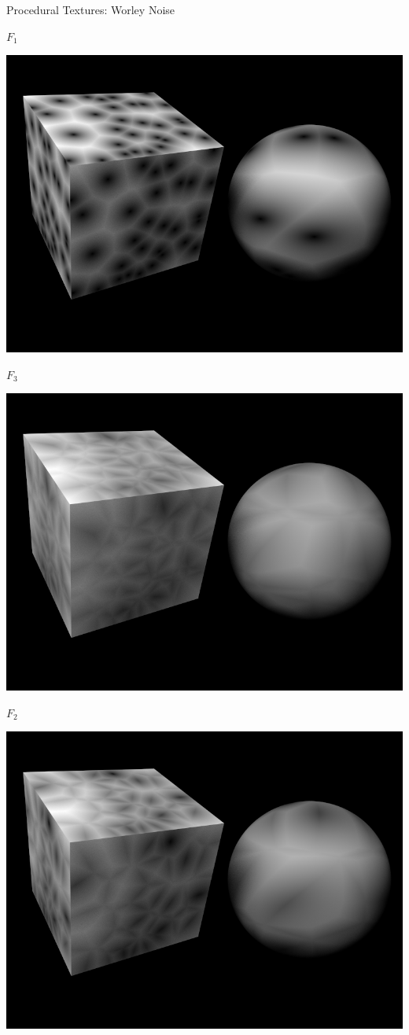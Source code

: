 \documentclass[utf8,stillsansserifmath,fleqn,t]{beamer}
\begin{document}
\begin{frame}[label=noise-5]
\frametitle{\insertsection}
Procedural Textures: Worley Noise\\
\begin{minipage}{.49\textwidth}
\centerline{$F_1$}
\centerline{\includegraphics[width=.7\textwidth]{./fig/noise-example-worley-d1.png}}
\centerline{$F_3$}
\centerline{\includegraphics[width=.7\textwidth]{./fig/noise-example-worley-d3.png}}
\end{minipage}\hfill
\begin{minipage}{.49\textwidth}
\centerline{$F_2$}
\centerline{\includegraphics[width=.7\textwidth]{./fig/noise-example-worley-d2.png}}

\end{minipage}
\end{frame}
\end{document}
